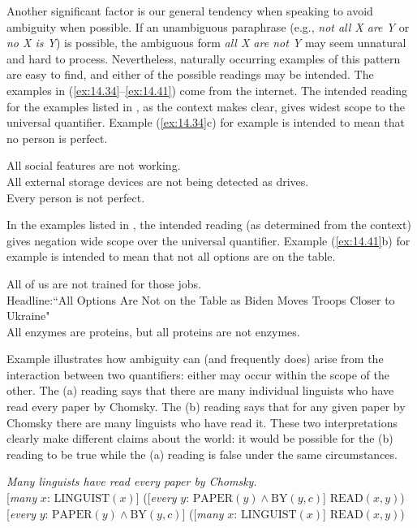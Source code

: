 {Another significant factor is our general tendency when speaking to avoid ambiguity when possible. If an unambiguous paraphrase (e.g., \textit{not all X are Y} or \textit{no  X is Y}) is possible, the ambiguous form \textit{all X are not Y} may seem unnatural and hard to process. Nevertheless, naturally occurring examples of this pattern are easy to find, and either of the possible readings may be intended. The examples in (\ref{ex:14.34}--\ref{ex:14.41}) come from the internet. The intended reading for the examples listed in , as the context makes clear, gives widest scope to the universal quantifier. Example (\ref{ex:14.34}c) for example is intended to mean that no person is perfect.


\ea \label{ex:14.34}
\ea All social features are not working.\\
\ex All external storage devices are not being detected as drives.\\
\ex Every person is not perfect.
   \z
\z


In the examples listed in , the intended reading (as determined from the context) gives negation wide scope over the universal quantifier. Example (\ref{ex:14.41}b) for example is intended to mean that not all options are on the table.


\ea \label{ex:14.41}
\ea All of us are not trained for those jobs.\\
\ex Headline:``All Options Are Not on the Table as Biden Moves Troops Closer to Ukraine"\\
\ex All enzymes are proteins, but all proteins are not enzymes.
                       \z
\z



Example  illustrates how ambiguity can (and frequently does) arise from the interaction between two quantifiers: either may occur within the scope of the other. The (a) reading says that there are many individual linguists who have read every paper by Chomsky. The (b) reading says that for any given paper by Chomsky there are many linguists who have read it. These two interpretations clearly make different claims about the world: it would be possible for the (b) reading to be true while the (a) reading is false under the same circumstances.


\ea \label{ex:14.35}
\textit{Many linguists have read every paper by Chomsky}.\\
\ea{}  [\textit{many} $x$: $\text{LINGUIST}(x)$] ([\textit{every} $y$: $\text{PAPER}(y) \wedge \text{BY}(y,c)$] $\text{READ}(x,y)$)\\
\ex{}  [\textit{every} $y$: $\text{PAPER}(y) \wedge \text{BY}(y,c)$] ([\textit{many} $x$: $\text{LINGUIST}(x)$] $\text{READ}(x,y)$)
                       \z
\z


}
